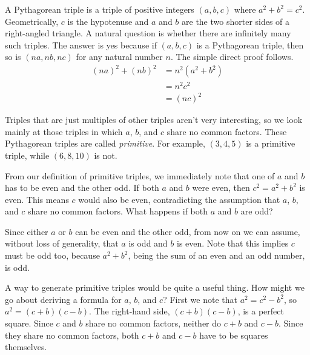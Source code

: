   A Pythagorean triple is a triple of positive integers \((a,b,c)\) where \(a^2+b^2=c^2\). Geometrically,
  \(c\) is the hypotenuse and \(a\) and \(b\) are the two shorter sides of a
  right-angled triangle. A natural question is whether there are infinitely
  many such triples. The answer is yes because if \((a,b,c)\) is a Pythagorean
  triple, then so is \((na,nb,nc)\) for any natural number \(n\). 
  The simple direct proof follows.
  \[
	  \begin{split}
		  (na)^2+(nb)^2&=n^2(a^2+b^2)\\
		  &=n^2c^2\\
		  &=(nc)^2
	  \end{split}
  \]

  Triples that are just multiples of other triples aren't very interesting, so
  we look mainly at those triples in which \(a\), \(b\), and \(c\) share no
  common factors. These Pythagorean triples are called \emph{primitive}. For
  example, \((3,4,5)\) is a primitive triple, while \((6,8,10)\) is not.


From our definition of primitive triples, we immediately note that one of \(a\)
and \(b\) has to be even and the other odd. If both \(a\) and \(b\) were even, then
\(c^2=a^2+b^2\) is even. This means \(c\) would also be even, contradicting the assumption that \(a\), \(b\), and \(c\)
share no common factors. What happens if both \(a\) and \(b\) are odd?

Since either \(a\) or \(b\) can be even and the other odd, from now on we can
assume, without loss of generality, that \(a\) is odd and \(b\) is even. Note
that this implies \(c\) must be odd too, because \(a^2+b^2\), being
the sum of an even and an odd number, is odd.

A way to generate primitive triples would be quite a useful thing. How
might we go about deriving a formula for \(a\), \(b\), and \(c\)?
First we note that \(a^2=c^2-b^2\), so \(a^2=(c+b)(c-b)\). The right-hand side,
\((c+b)(c-b)\), is a perfect square. Since \(c\) and \(b\) share no
common factors, neither do \(c+b\) and \(c-b\). Since they share
no common factors, both \(c+b\) and \(c-b\) have to be squares themselves.

